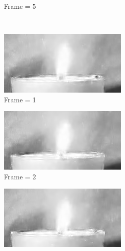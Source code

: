 \documentclass[a4paper, landscape]{article}
\begin{document}
\begin{figure}[H]
\begin{subfigure}{0.13\linewidth}
		\caption{Frame = 5}
	\end{subfigure}\\
	\begin{subfigure}{0.13\linewidth}
		\centering
		\includegraphics[width=\linewidth]{flame/reconstructed, T = 7, frame = 1.png}
		\caption{Frame = 1}
	\end{subfigure}
	\begin{subfigure}{0.13\linewidth}
		\centering
		\includegraphics[width=\linewidth]{flame/reconstructed, T = 7, frame = 2.png}
		\caption{Frame = 2}
	\end{subfigure}
	\begin{subfigure}{0.13\linewidth}
		\centering
		\includegraphics[width=\linewidth]{flame/reconstructed, T = 7, frame = 3.png}

\end{subfigure}
\end{figure}
\end{document}
